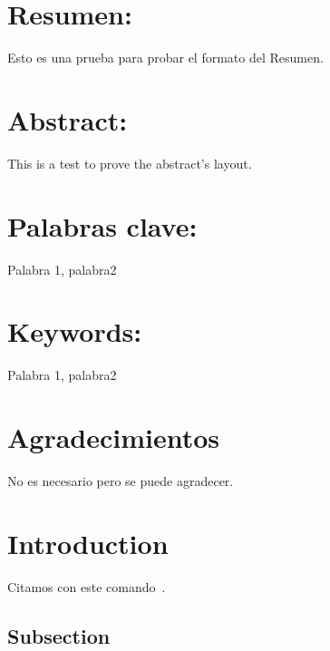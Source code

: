 \documentclass[12pt, american, spanish]{../packages/masterfotonicaucm}
\begin{document}
\pagestyle{plain}


\section*{{\large{}Resumen: }}

Esto es una prueba para probar el formato del Resumen.

\section*{{\large{}Abstract: }}

This is a test to prove the abstract's layout.

\vfill

\section*{{\large{}Palabras clave: }}

Palabra 1, palabra2

\section*{{\large{}Keywords: }}

Palabra 1, palabra2

\cleardoublepage%

\section*{{\large{}Agradecimientos }}

No es necesario pero se puede agradecer.

\cleardoublepage%
\tableofcontents%
\cleardoublepage%


\pagestyle{plain}


\section{Introduction}

Citamos con este comando~\cite{kour2014fast}.

\lipsum[1-2]

\subsection{Subsection}
\end{document}
